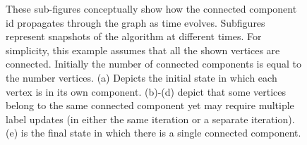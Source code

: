 \begin{figure}[t]
\centering

  \caption{These sub-figures conceptually show how the connected component id propagates through 
  the graph as time evolves. Subfigures represent snapshots of the algorithm at different times. 
For simplicity, this example assumes that all the shown vertices are connected. Initially the 
number of connected components is equal to the number vertices. (a) Depicts the initial state in 
which each vertex is in its own component. (b)-(d) depict that some vertices belong to the same 
connected component yet may require multiple label updates (in either the same iteration or a 
separate iteration).
	(e) is the final state in which there is a single connected component.}
  \label{fig:svPropagation}
\end{figure}


  